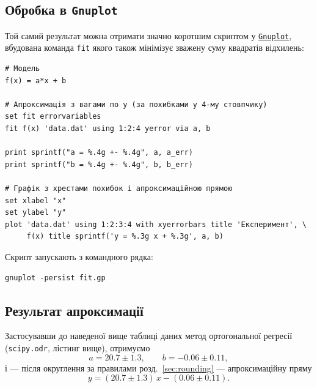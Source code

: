 \subsection{Обробка в \texttt{Gnuplot}}

Той самий результат можна отримати значно коротшим скриптом у
\href{http://www.gnuplot.info}{\texttt{Gnuplot}}, вбудована команда
\texttt{fit} якого також мінімізує зважену суму квадратів відхилень:

\bgroup
\begin{verbatim}
# Модель
f(x) = a*x + b

# Апроксимація з вагами по y (за похибками у 4-му стовпчику)
set fit errorvariables
fit f(x) 'data.dat' using 1:2:4 yerror via a, b

print sprintf("a = %.4g +- %.4g", a, a_err)
print sprintf("b = %.4g +- %.4g", b, b_err)

# Графік з хрестами похибок і апроксимаційною прямою
set xlabel "x"
set ylabel "y"
plot 'data.dat' using 1:2:3:4 with xyerrorbars title 'Експеримент', \
     f(x) title sprintf('y = %.3g x + %.3g', a, b)
\end{verbatim}
\egroup

Скрипт запускають з командного рядка:
\begin{verbatim}
gnuplot -persist fit.gp
\end{verbatim}


\subsection{Результат апроксимації}

Застосувавши до наведеної вище таблиці даних метод ортогональної
регресії (\texttt{scipy.odr}, лістинг вище), отримуємо
\begin{equation}\label{eq:example_result}
	a = 20.7 \pm 1.3, \qquad b = -0.06 \pm 0.11,
\end{equation}
і --- після округлення за правилами розд.~\ref{sec:rounding} ---
апроксимаційну пряму
\begin{equation*}
    y = (20.7\pm1.3)\,x - (0.06\pm0.11).
\end{equation*}

